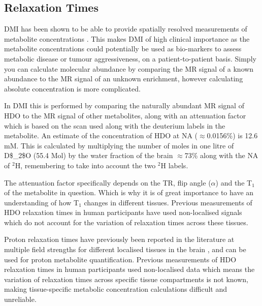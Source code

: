 \subsection{Relaxation Times}

\Ac{DMI} has been shown to be able to provide spatially resolved measurements of metabolite concentrations \cite{Kreis2020MeasuringMRI,Lu2017QuantitativeSpectroscopy}. This makes \ac{DMI} of high clinical importance as the metabolite concentrations could potentially be used as bio-markers to assess metabolic disease or tumour aggressiveness, on a patient-to-patient basis. Simply you can calculate molecular abundance by comparing the MR signal of a known abundance to the MR signal of an unknown enrichment, however calculating absolute concentration is more complicated. 

In \ac{DMI} this is performed by comparing the naturally abundant MR signal of \ac{HDO} to the MR signal of other metabolites, along with an attenuation factor which is based on the scan used along with the deuterium labels in the metabolite. An estimate of the concentration of \ac{HDO} at \ac{NA} ($\approx$0.0156\%) is 12.6 mM. This is calculated by multiplying the number of moles in one litre of \ac{D$_2$O} (55.4 Mol) by the water fraction of the brain $\approx$73\% along with the \ac{NA} of $^2$H, remembering to take into account the two $^2$H labels.

The attenuation factor specifically depends on the \ac{TR}, flip angle ($\alpha$) and the T$_1$ of the metabolite in question. Which is why it is of great importance to have an understanding of how T$_1$ changes in different tissues. Previous measurements of \ac{HDO} relaxation times in human participants have used non-localised signals \cite{DeFeyter2018DeuteriumVivo,DeFeyter2021DeuteriumFuture,Ruhm2021DeuteriumResolution} which do not account for the variation of relaxation times across these tissues.

Proton relaxation times have previously been reported in the literature at multiple field strengths for different localised tissues in the brain \cite{Wright2008WaterOptimization}, and can be used for proton metabolite quantification. Previous measurements of \ac{HDO} relaxation times in human participants used non-localised data \cite{DeFeyter2018DeuteriumVivo, Ruhm2022Dynamic9.4T, Gursan2022ResidualMuscle} which means the variation of relaxation times across specific tissue compartments is not known, making tissue-specific metabolic concentration calculations difficult and unreliable.  

